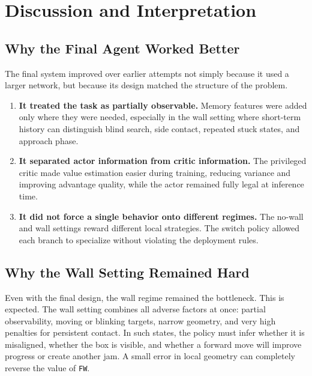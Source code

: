 \documentclass[11pt]{article}
\begin{document}
\section{Discussion and Interpretation}

\subsection{Why the Final Agent Worked Better}

The final system improved over earlier attempts not simply because it used a larger
network, but because its design matched the structure of the problem.

\begin{enumerate}[leftmargin=1.5em]
  \item \textbf{It treated the task as partially observable.} Memory features were added
  only where they were needed, especially in the wall setting where short-term history
  can distinguish blind search, side contact, repeated stuck states, and approach phase.

  \item \textbf{It separated actor information from critic information.} The privileged
  critic made value estimation easier during training, reducing variance and improving
  advantage quality, while the actor remained fully legal at inference time.

  \item \textbf{It did not force a single behavior onto different regimes.} The no-wall and
  wall settings reward different local strategies. The switch policy allowed each branch to
  specialize without violating the deployment rules.
\end{enumerate}

\subsection{Why the Wall Setting Remained Hard}

Even with the final design, the wall regime remained the bottleneck. This is expected.
The wall setting combines all adverse factors at once: partial observability, moving or
blinking targets, narrow geometry, and very high penalties for persistent contact. In
such states, the policy must infer whether it is misaligned, whether the box is visible,
and whether a forward move will improve progress or create another jam. A small error
in local geometry can completely reverse the value of \texttt{FW}.
\end{document}
